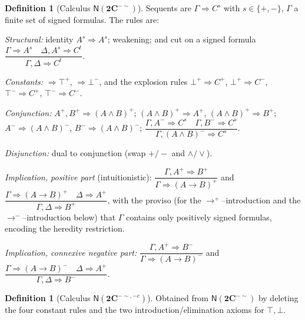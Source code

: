 \documentclass{amsart}
\theoremstyle{plain}
\theoremstyle{definition}
\newtheorem{definition}[theorem]{Definition}
\newcommand{\To}{\rightarrow}
\newcommand{\Ci}{\mathbf{2C}^{-{\sim}}}        %
\newcommand{\Cii}{\mathbf{2C}^{-{\sim},-c}}    %
\begin{document}
\begin{definition}[Calculus $\mathsf{N}(\Ci)$]\label{def:Ncalc}
Sequents are $\Gamma\Rightarrow C^{s}$ with $s\in\{+,-\}$, $\Gamma$ a finite set
of signed formulas. The rules are:

\smallskip\noindent\emph{Structural:} identity $A^{s}\Rightarrow A^{s}$;
weakening; and cut on a signed formula
$\dfrac{\Gamma\Rightarrow A^{s}\quad \Delta,A^{s}\Rightarrow C^{t}}
       {\Gamma,\Delta\Rightarrow C^{t}}$.

\smallskip\noindent\emph{Constants:} $\Rightarrow\top^{+}$, $\Rightarrow\bot^{-}$,
and the explosion rules $\bot^{+}\Rightarrow C^{+}$, $\bot^{+}\Rightarrow C^{-}$,
$\top^{-}\Rightarrow C^{+}$, $\top^{-}\Rightarrow C^{-}$.

\smallskip\noindent\emph{Conjunction:}
$A^{+},B^{+}\Rightarrow(A\wedge B)^{+}$; $(A\wedge B)^{+}\Rightarrow A^{+}$,
$(A\wedge B)^{+}\Rightarrow B^{+}$;
$A^{-}\Rightarrow(A\wedge B)^{-}$, $B^{-}\Rightarrow(A\wedge B)^{-}$;
$\dfrac{\Gamma,A^{-}\Rightarrow C^{s}\quad\Gamma,B^{-}\Rightarrow C^{s}}
       {\Gamma,(A\wedge B)^{-}\Rightarrow C^{s}}$.

\smallskip\noindent\emph{Disjunction:} dual to conjunction (swap $+/-$ and
$\wedge/\vee$).

\smallskip\noindent\emph{Implication, positive part} (intuitionistic):
$\dfrac{\Gamma,A^{+}\Rightarrow B^{+}}{\Gamma\Rightarrow(A\To B)^{+}}$ and
$\dfrac{\Gamma\Rightarrow(A\To B)^{+}\quad\Delta\Rightarrow A^{+}}
       {\Gamma,\Delta\Rightarrow B^{+}}$, with the proviso (for the
$\To^{+}$--introduction and the $\To^{-}$--introduction below) that $\Gamma$
contains only positively signed formulas, encoding the heredity restriction.

\smallskip\noindent\emph{Implication, connexive negative part:}
$\dfrac{\Gamma,A^{+}\Rightarrow B^{-}}{\Gamma\Rightarrow(A\To B)^{-}}$ and
$\dfrac{\Gamma\Rightarrow(A\To B)^{-}\quad\Delta\Rightarrow A^{+}}
       {\Gamma,\Delta\Rightarrow B^{-}}$.
\end{definition}

\begin{definition}[Calculus $\mathsf{N}(\Cii)$]
Obtained from $\mathsf{N}(\Ci)$ by deleting the four constant rules and the two
introduction/elimination axioms for $\top,\bot$.
\end{definition}
\end{document}
